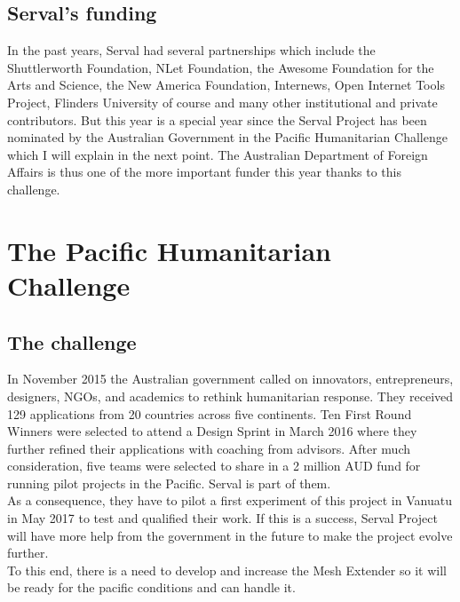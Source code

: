 \subsection{Serval's funding}
In the past years, Serval had several partnerships which include the Shuttlerworth Foundation, NLet Foundation, the Awesome Foundation for the Arts and Science, the New America Foundation, Internews, Open Internet Tools Project, Flinders University of course and many other institutional and private contributors. But this year is a special year since the Serval Project has been nominated by the Australian Government in the Pacific Humanitarian Challenge which I will explain in the next point. The Australian Department of Foreign Affairs is thus one of the more important funder this year thanks to this challenge. 


\section{The Pacific Humanitarian Challenge}
\subsection{The challenge}
In November 2015 the Australian government called on innovators, entrepreneurs, designers, NGOs, and academics to rethink humanitarian response. They received 129 applications from 20 countries across five continents. Ten First Round Winners were selected to attend a Design Sprint in March 2016 where they further refined their applications with coaching from advisors. After much consideration, five teams were selected to share in a 2 million AUD fund for running pilot projects in the Pacific. Serval is part of them. \\
As a consequence, they have to pilot a first experiment of this project in Vanuatu in May 2017 to test and qualified their work. If this is a success, Serval Project will have more help from the government in the future to make the project evolve further. \\
To this end, there is a need to develop and increase the Mesh Extender so it will be ready for the pacific conditions and can handle it.

